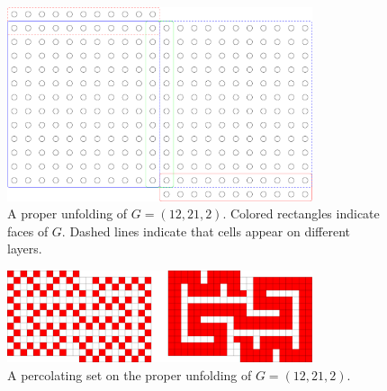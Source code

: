 \begin{figure}[]
\centering
\includegraphics[width=0.8\textwidth]{figures/4/12x21x2_unfolded.pdf}
\caption{A proper unfolding of $G= (12,21,2)$. Colored rectangles indicate faces of $G$. Dashed lines indicate that cells appear on different layers. }
\label{fig:12x21x2_unfolded}
\end{figure} 

\begin{figure}[]
\centering
\includegraphics[width=0.8\textwidth]{figures/4/12x21x2_unfolded_lethal.pdf}
\caption{A percolating set on the proper unfolding of $G= (12,21,2)$.}
\label{fig:12x21x2_unfolded_lethal}
\end{figure} 

